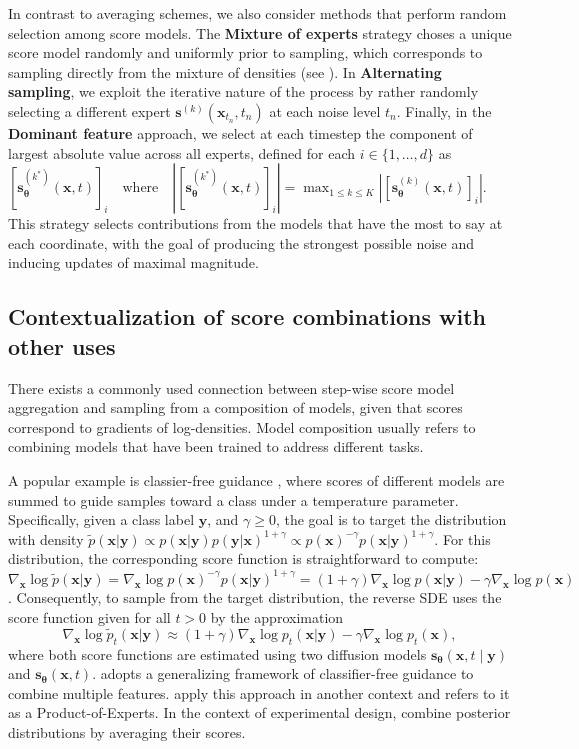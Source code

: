 \documentclass[10pt]{article} %
\def\rvs{{\mathbf{s}}}
\def\rvx{{\mathbf{x}}}
\def\rvy{{\mathbf{y}}}
\def\vtheta{{\bm{\theta}}}
\def\vs{{\bm{s}}}
\begin{document}
In contrast to averaging schemes, we also consider methods that perform random selection among score models. The \textbf{Mixture of experts} strategy choses a unique score model randomly and uniformly prior to sampling, which corresponds to sampling directly from the mixture of densities (see ). In \textbf{Alternating sampling}, we exploit the iterative nature of the process by rather randomly selecting a different expert $\vs^{(k)}(\rvx_{t_n}, t_n)$ at each noise level  $t_n$. Finally, in the \textbf{Dominant feature} approach, we select at each timestep the component of largest absolute value across all experts, defined for each $i \in \{1,\dots,d\}$ as
$[\vs^{(k^*)}_\vtheta(\rvx,t)]_i \quad \text{where} \quad
|[\vs^{(k^*)}_\vtheta(\rvx,t)]_i| = \max_{1 \leq k \leq K} |[\vs^{(k)}_\vtheta(\rvx,t)]_i|$.
This strategy selects contributions from the models that have the most to say at each coordinate, with the goal of producing the strongest possible noise and inducing updates of maximal magnitude.

\subsection{Contextualization of score combinations with other uses}\label{section: score composition contextualization}

There exists a commonly used connection between step-wise score model aggregation and sampling from a composition of models, given that scores correspond to gradients of log-densities. Model composition usually refers to combining models that have been trained to address different tasks.

A popular example is classier-free guidance \citep{ho2022classifier}, where scores of different models are summed to guide samples toward a class under a temperature parameter. Specifically, given a class label $\rvy$, and $\gamma \geq 0$, the goal is to target the distribution with density $\tilde{p}(\rvx|\rvy) \propto p(\rvx|\rvy)p(\rvy|\rvx)^{1+\gamma} \propto p(\rvx)^{-\gamma}p(\rvx|\rvy)^{1+\gamma}$. For this distribution, the corresponding score function is straightforward to compute: $
\nabla_\rvx \log \widetilde{p}(\rvx|\rvy)  = \nabla_\rvx \log p(\rvx)^{-\gamma}p(\rvx|\rvy)^{1+\gamma} = (1 + \gamma) \nabla_{\rvx} \log p(\rvx|\rvy) - \gamma \nabla_{\rvx} \log p(\rvx)$. Consequently, to sample from the target distribution, the reverse SDE uses the score function given for all $t>0$ by the approximation
\begin{equation}\label{eq: guidance equality score}
\nabla_\rvx \log \widetilde{p}_t(\rvx|\rvy) \approx (1 + \gamma) \nabla_{\rvx} \log p_t(\rvx|\rvy) - \gamma \nabla_{\rvx} \log p_t(\rvx),
\end{equation}
where both score functions are estimated using two diffusion models $\rvs_\vtheta(\rvx,t \mid \rvy)$ and $\rvs_\vtheta(\rvx,t)$. \citet{liu2022compositional} adopts a generalizing framework of classifier-free guidance to combine multiple features. \citet{alexanderson2023listen} apply this approach in another context and refers to it as a Product-of-Experts. In the context of experimental design, \citet{iollo2025bayesian} combine posterior distributions by averaging their scores. 
\end{document}
